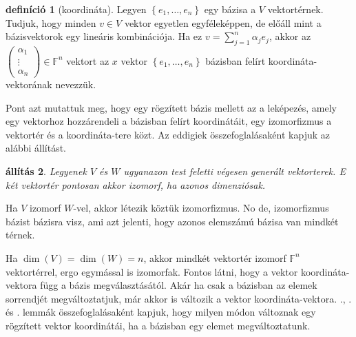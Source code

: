 \documentclass[9pt, a4paper, showtrims]{memoir}
\makeatletter
\let\Aref\relax
\renewenvironment{proof}[1][\proofname]
    {\par\pushQED{\qed}%
    \normalfont \topsep6\p@\@plus6\p@\relax
    \trivlist
    \item[\hskip\labelsep
        \itshape
    #1\@addpunct{:}]\ignorespaces}
    {\popQED\endtrivlist\@endpefalse}
\theoremstyle{plain}
\newtheorem{proposition}{állítás}[chapter]
\theoremstyle{remark}
\theoremstyle{definition}
\newtheorem{definition}[proposition]{definíció}
\makeatother
\begin{document}
\begin{definition}[koordináta]
	Legyen $\left\{ e_1,\ldots,e_n \right\}$ egy bázisa a $V$ vektortérnek.
	Tudjuk, hogy minden $v\in V$ vektor egyetlen egyféleképpen, de előáll mint a bázisvektorok egy lineáris kombinációja.
	Ha ez $v=\sum_{j=1}^n\alpha_je_j$, akkor az
	\begin{math}
		\begin{pmatrix}
			\alpha_1 \\ \vdots\\ \alpha_n
		\end{pmatrix}
		\in
		\mathbb{F}^n
	\end{math}
	vektort az $x$ vektor $\left\{ e_1,\ldots,e_n \right\}$ bázisban felírt koordináta-vektorának nevezzük.
\end{definition}
Pont azt mutattuk meg, hogy egy rögzített bázis mellett az a leképezés,
amely egy vektorhoz hozzárendeli a bázisban felírt koordinátáit, egy izomorfizmus
a vektortér és a koordináta-tere közt.
Az eddigiek összefoglalásaként kapjuk az alábbi állítást.
\begin{proposition}
	Legyenek $V$ és $W$ ugyanazon test feletti végesen generált vektorterek.
	E két vektortér pontosan akkor izomorf, ha azonos dimenziósak.
\end{proposition}
\begin{proof}
	Ha $V$ izomorf $W$-vel, akkor létezik köztük izomorfizmus.
	No de, izomorfizmus bázist bázisra visz, ami azt jelenti, hogy azonos elemszámú
	bázisa van mindkét térnek.

	Ha $\dim(V)=\dim(W)=n$, akkor mindkét vektortér izomorf $\mathbb{F}^n$ vektortérrel,
	ergo egymással is izomorfak.
\end{proof}
Fontos látni, hogy a vektor koordináta-vektora függ a bázis megválasztásától.
Akár ha csak a bázisban az elemek sorrendjét megváltoztatjuk,
már akkor is változik a vektor koordináta-vektora.
\Aref{le:gencsere}., .  és . lemmák összefoglalásaként kapjuk,
hogy milyen módon változnak egy rögzített vektor koordinátái,
ha a bázisban egy elemet megváltoztatunk.
\end{document}
